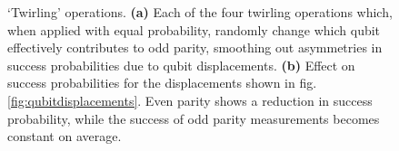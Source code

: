 \begin{figure}
	\centering
	\hspace{0.05\columnwidth}
	\caption{`Twirling' operations. \textbf{(a)} Each of the four twirling operations which, when applied with equal probability, randomly change which qubit effectively contributes to odd parity, smoothing out asymmetries in success probabilities due to qubit displacements. \textbf{(b)} Effect on success probabilities for the displacements shown in fig.\@ \ref{fig:qubitdisplacements}. Even parity shows a reduction in success probability, while the success of odd parity measurements becomes constant on average.}
\end{figure}